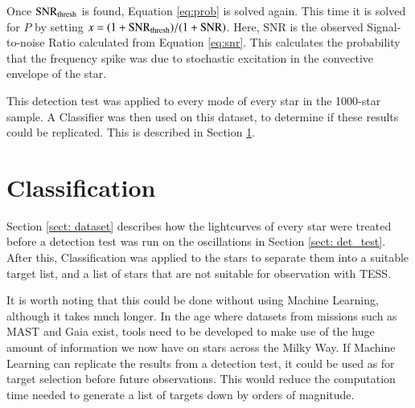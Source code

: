 \documentclass[a4paper,fleqn,usenatbib,useAMS]{mnras}
\begin{document}
Once $\rm SNR_{thresh}$ is found, Equation \ref{eq:prob} is solved again. This time it is solved for $P$ by setting $x=(1+{\rm SNR_{thresh}})/(1+{\rm SNR})$. Here, SNR is the observed Signal-to-noise Ratio calculated from Equation \ref{eq:snr}. This calculates the probability that the frequency spike was due to stochastic excitation in the convective envelope of the star.

This detection test was applied to every mode of every star in the 1000-star sample. A Classifier was then used on this dataset, to determine if these results could be replicated. This is described in Section \ref{classifier}.


\section{Classification}
\label{classifier}

Section \ref{sect: dataset} describes how the lightcurves of every star were treated before a detection test was run on the oscillations in Section \ref{sect: det_test}. After this, Classification was applied to the stars to separate them into a suitable target list, and a list of stars that are not suitable for observation with TESS.

It is worth noting that this could be done without using Machine Learning, although it takes much longer. In the age where datasets from missions such as MAST and Gaia \citep{gaia_collaboration_gaia_2016} exist, tools need to be developed to make use of the huge amount of information we now have on stars across the Milky Way. If Machine Learning can replicate the results from a detection test, it could be used as for target selection before future observations. This would reduce the computation time needed to generate a list of targets down by orders of magnitude.
\end{document}
